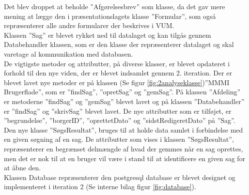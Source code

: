 Det blev droppet at beholde ”Afgørelsesbrev” som klasse, da det gav mere mening at lægge den i præsentationslagets klasse ”Formular”, som også repræsenterer alle andre formularer der beskrives i VUM.\\
Klassen ”Sag” er blevet rykket ned til datalaget og kan tilgås gennem Databehandler klassen, som er den klasse der repræsenterer datalaget og skal varetage al kommunikation med databasen.\\
De vigtigste metoder og attributter, på diverse klasser, er blevet opdateret i forhold til den nye viden, der er blevet indsamlet gennem 2. iteration. Der er blevet lavet nye metoder er på klassen (Se figur \ref{fig:2analyseklasse})”MMMI Brugerflade”, som er ”findSag”, ”opretSag” og ”gemSag”. På klassen ”Afdeling” er metoderne ”findSag” og ”gemSag” blevet lavet og på klassen ”Databehandler” er ”findSag” og ”skrivSag” blevet lavet. De nye attributter som er tilføjet, er ”begrundelse”, ”borgerID”, ”oprettetDato” og ”sidstRedigeretDato” på ”Sag”. \\
Den nye klasse ”SøgsResultat”, bruges til at holde data samlet i forbindelse med en given søgning af en sag. De attributter som vises i klassen ”SøgsResultat”, repræsenterer en begrænset delmængde af hvad der gemmes når en sag oprettes, men det er nok til at en bruger vil være i stand til at identificere en given sag for at åbne den.\\
Klassen Database repræsenterer den postgresql database er blevet designet og implementeret i iteration 2 (Se interne bilag figur \ref{fig:database}).
